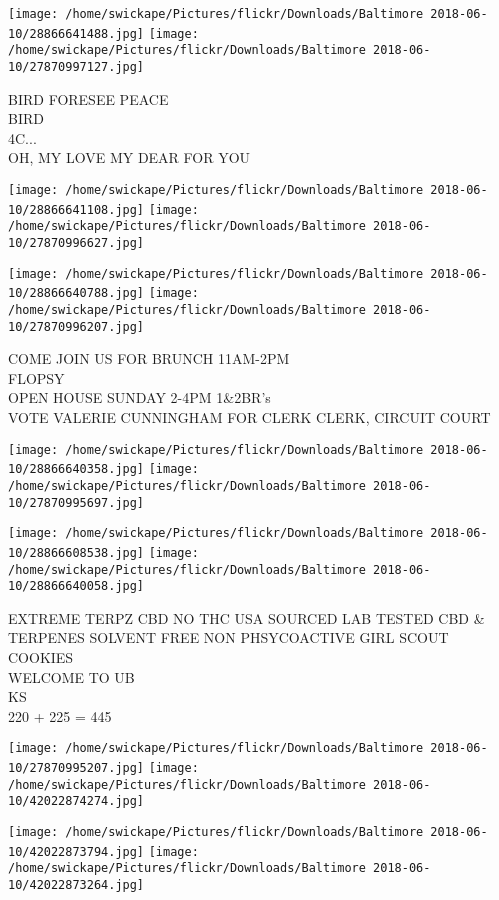 \documentclass[10pt,letterpaper]{article}
\begin{document}
\texttt{[image: /home/swickape/Pictures/flickr/Downloads/Baltimore 2018-06-10/28866641488.jpg]}
\texttt{[image: /home/swickape/Pictures/flickr/Downloads/Baltimore 2018-06-10/27870997127.jpg]}

BIRD FORESEE PEACE\\
BIRD\\
4C...\\
OH, MY LOVE MY DEAR FOR YOU
\pagebreak

\texttt{[image: /home/swickape/Pictures/flickr/Downloads/Baltimore 2018-06-10/28866641108.jpg]}
\texttt{[image: /home/swickape/Pictures/flickr/Downloads/Baltimore 2018-06-10/27870996627.jpg]}

\texttt{[image: /home/swickape/Pictures/flickr/Downloads/Baltimore 2018-06-10/28866640788.jpg]}
\texttt{[image: /home/swickape/Pictures/flickr/Downloads/Baltimore 2018-06-10/27870996207.jpg]}

COME JOIN US FOR BRUNCH 11AM{-}2PM\\
FLOPSY\\
OPEN HOUSE SUNDAY 2{-}4PM 1\&2BR's\\
VOTE VALERIE CUNNINGHAM FOR CLERK CLERK, CIRCUIT COURT
\pagebreak

\texttt{[image: /home/swickape/Pictures/flickr/Downloads/Baltimore 2018-06-10/28866640358.jpg]}
\texttt{[image: /home/swickape/Pictures/flickr/Downloads/Baltimore 2018-06-10/27870995697.jpg]}

\texttt{[image: /home/swickape/Pictures/flickr/Downloads/Baltimore 2018-06-10/28866608538.jpg]}
\texttt{[image: /home/swickape/Pictures/flickr/Downloads/Baltimore 2018-06-10/28866640058.jpg]}

EXTREME TERPZ CBD NO THC USA SOURCED LAB TESTED CBD \& TERPENES SOLVENT FREE NON PHSYCOACTIVE GIRL SCOUT COOKIES\\
WELCOME TO UB\\
KS\\
220 + 225 = 445
\pagebreak

\texttt{[image: /home/swickape/Pictures/flickr/Downloads/Baltimore 2018-06-10/27870995207.jpg]}
\texttt{[image: /home/swickape/Pictures/flickr/Downloads/Baltimore 2018-06-10/42022874274.jpg]}

\texttt{[image: /home/swickape/Pictures/flickr/Downloads/Baltimore 2018-06-10/42022873794.jpg]}
\texttt{[image: /home/swickape/Pictures/flickr/Downloads/Baltimore 2018-06-10/42022873264.jpg]}
\end{document}
